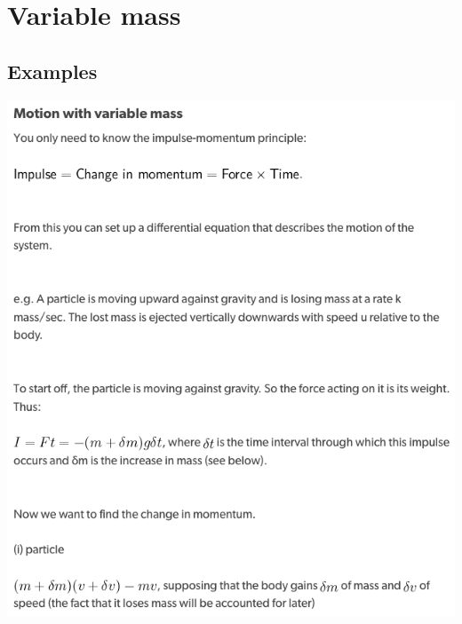 \documentclass[a4paper]{article}
\begin{document}
\section{Variable mass}
\subsection{Examples}
\begin{center}
    \includegraphics[scale=0.5]{img_M/22_eg1}
\end{center}
\end{document}
